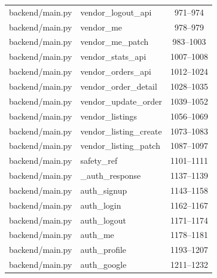 \begin{center}
\begin{longtable}{@{}p{4.6cm}p{5.2cm}c@{}}
backend/main.py & vendor\_logout\_api & 971--974 \\
backend/main.py & vendor\_me & 978--979 \\
backend/main.py & vendor\_me\_patch & 983--1003 \\
backend/main.py & vendor\_stats\_api & 1007--1008 \\
backend/main.py & vendor\_orders\_api & 1012--1024 \\
backend/main.py & vendor\_order\_detail & 1028--1035 \\
backend/main.py & vendor\_update\_order & 1039--1052 \\
backend/main.py & vendor\_listings & 1056--1069 \\
backend/main.py & vendor\_listing\_create & 1073--1083 \\
backend/main.py & vendor\_listing\_patch & 1087--1097 \\
backend/main.py & safety\_ref & 1101--1111 \\
backend/main.py & \_auth\_response & 1137--1139 \\
backend/main.py & auth\_signup & 1143--1158 \\
backend/main.py & auth\_login & 1162--1167 \\
backend/main.py & auth\_logout & 1171--1174 \\
backend/main.py & auth\_me & 1178--1181 \\
backend/main.py & auth\_profile & 1193--1207 \\
backend/main.py & auth\_google & 1211--1232 \\
\bottomrule
\end{longtable}
\end{center}
